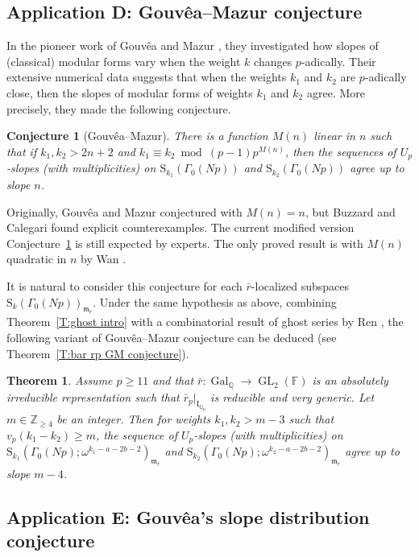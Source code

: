 \documentclass[12pt]{amsart}
\newtheorem{theorem}[subsection]{Theorem}
\newtheorem{conjecture}[subsection]{Conjecture}
\theoremstyle{definition}
\numberwithin{equation}{subsection}
\def\gothm{\mathfrak{m}}
\def\FF{\mathbb{F}}
\def\QQ{\mathbb{Q}}
\def\ZZ{\mathbb{Z}}
\def\rmI{\mathrm{I}}
\def\rmS{\mathrm{S}}
\DeclareMathOperator{\Gal}{Gal}
\DeclareMathOperator{\GL}{GL}
\begin{document}
\subsection{Application D: Gouv\^ea--Mazur conjecture}
\label{S:aplication D GM conjecture}
In the pioneer work of
Gouv\^ea and Mazur \cite{gouvea-mazur}, they investigated how slopes of (classical) modular forms vary when the weight $k$ changes $p$-adically. Their extensive numerical data suggests that when the weights $k_1$ and $k_2$ are $p$-adically close, then the slopes of modular forms of weights $k_1$ and $k_2$ agree. More precisely, they made the following conjecture.
\begin{conjecture}
[Gouv\^ea--Mazur]
\label{Conj:Gouvea-mazur}
There is a function $M(n)$ linear in $n$ such that if $k_1, k_2 > 2n + 2$ and
$k_1 \equiv k_2 \bmod (p-1)p^{M(n)}$, then the sequences of $U_p$-slopes (with multiplicities) on $\rmS_{k_1}(\Gamma_0(Np))$ and $\rmS_{k_2}(\Gamma_0(Np))$ agree up to slope $n$.
\end{conjecture}
Originally,  Gouv\^ea and Mazur conjectured with $M(n)=n$, but  Buzzard and Calegari \cite{buzzard-calegari} found explicit counterexamples. The current modified version Conjecture~\ref{Conj:Gouvea-mazur} is still expected by experts. The only proved result is with $M(n)$ quadratic in $n$ by Wan \cite{wan}.

It is natural to consider this conjecture for each $\bar r$-localized subspaces $\rmS_k(\Gamma_0(Np))_{\gothm_{\bar r}}$. Under the same hypothesis as above, combining Theorem~\ref{T:ghost intro} with a combinatorial result of ghost series by Ren \cite{ren}, the following variant of Gouv\^ea--Mazur conjecture can be deduced (see Theorem~\ref{T:bar rp GM conjecture}).

\begin{theorem}
Assume $p \geq 11$ and that $\bar r: \Gal_{\QQ} \to \GL_2(\FF)$ is an absolutely irreducible representation such that $\bar r_p|_{\rmI_{\QQ_p}}$ is reducible and very generic. Let $m \in \ZZ_{\geq 4}$ be an integer. Then for weights $k_1, k_2 > m-3$ such that $v_p(k_1-k_2)\geq m$, the sequence of $U_p$-slopes (with multiplicities) on $\rmS_{k_1}(\Gamma_0(Np); \omega^{k_1-a-2b-2})_{\gothm_{\bar r}}$ and $\rmS_{k_2}(\Gamma_0(Np);\omega^{k_2-a-2b-2})_{\gothm_{\bar r}}$ agree up to slope $m-4$.
\end{theorem}


\subsection{Application E: Gouv\^ea's slope distribution conjecture}
\label{S:aplication E Gouvea slope distribution}
\end{document}
